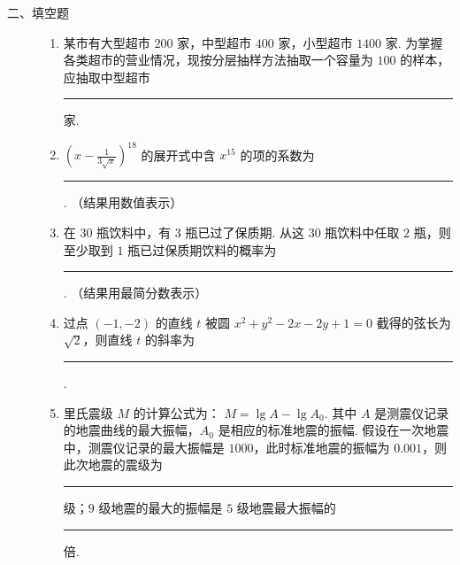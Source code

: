\begin{description}

    \item[二、填空题]

    \begin{enumerate}[leftmargin=5pt]

      \addtocounter{enumi}{+10}

        \item 某市有大型超市 \(200\text{ 家}\)，中型超市 \(400\text{ 家}\)，小型超市 \(1400\text{ 家}\). 为掌握各类超市的营业情况，现按分层抽样方法抽取一个容量为 \(100\) 的样本，应抽取中型超市\rule[-0.3ex]{3em}{0.4pt} 家.

        \item \(\left(x - \frac{1}{3\sqrt{x}}\right)^{18}\) 的展开式中含 \(x^{15}\) 的项的系数为\rule[-0.3ex]{3em}{0.4pt}. （结果用数值表示）

        \item 在 \(30\) 瓶饮料中，有 \(3\) 瓶已过了保质期. 从这 \(30\) 瓶饮料中任取 \(2\) 瓶，则至少取到 \(1\) 瓶已过保质期饮料的概率为\rule[-0.3ex]{3em}{0.4pt}. （结果用最简分数表示）

        \item 过点 \((-1, -2)\) 的直线 \(t\) 被圆 \(x^{2} + y^{2} - 2x - 2y + 1 = 0\) 截得的弦长为 \(\sqrt{2}\)，则直线 \(t\) 的斜率为\rule[-0.3ex]{3em}{0.4pt}.

        \item 里氏震级 \(M\) 的计算公式为： \(M = \lg A - \lg A_0\). 其中 \(A\) 是测震仪记录的地震曲线的最大振幅，\(A_0\) 是相应的标准地震的振幅. 假设在一次地震中，测震仪记录的最大振幅是 \(1000\)，此时标准地震的振幅为 \(0.001\)，则此次地震的震级为\rule[-0.3ex]{3em}{0.4pt}\(\text{级}\)；\(9\text{ 级}\)地震的最大的振幅是 \(5\text{ 级}\)地震最大振幅的\rule[-0.3ex]{3em}{0.4pt}\(\text{倍}\).

    \end{enumerate}

\end{description}

